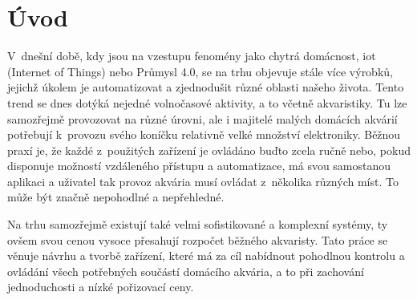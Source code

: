 \chapter*{Úvod}
{}


V~dnešní době, kdy jsou na vzestupu fenomény jako chytrá domácnost, \acs{iot} (Internet of Things) nebo Průmysl 4.0, se na trhu objevuje stále více výrobků, jejichž úkolem je automatizovat a zjednodušit různé oblasti našeho života. Tento trend se dnes dotýká nejedné volnočasové aktivity, a to včetně akvaristiky. Tu lze samozřejmě provozovat na různé úrovni, ale i majitelé malých domácích akvárií potřebují k~provozu svého koníčku relativně velké množství elektroniky. 
Běžnou praxí je, že každé z~použitých zařízení je ovládáno buďto zcela ručně nebo, pokud disponuje možností vzdáleného přístupu a automatizace, má svou samostanou aplikaci a uživatel tak provoz akvária musí ovládat z~několika různých míst. To může být značně nepohodlné a nepřehledné.

Na trhu samozřejmě existují také velmi sofistikované a komplexní systémy, ty ovšem svou cenou vysoce přesahují rozpočet běžného  akvaristy. Tato práce se věnuje návrhu a tvorbě zařízení, které má za cíl nabídnout pohodlnou kontrolu a ovládání všech potřebných součástí domácího akvária, a to při zachování jednoduchosti a nízké pořizovací ceny.
